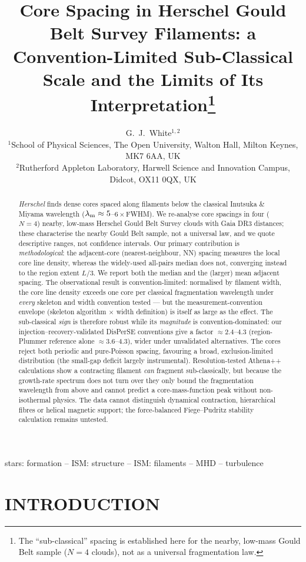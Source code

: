 \documentclass[usenatbib,twoside,twocolumn]{mnras}
\title[Sub-classical core spacing in HGBS filaments]{Core Spacing in Herschel Gould Belt Survey Filaments: a Convention-Limited Sub-Classical Scale and the Limits of Its Interpretation\thanks{The ``sub-classical'' spacing is established here for the nearby, low-mass Gould Belt sample ($N=4$ clouds), not as a universal fragmentation law.}}
\author[G.~J.~White]{G.~J.~White$^{1,2}$\\
$^{1}$School of Physical Sciences, The Open University, Walton Hall, Milton Keynes, MK7 6AA, UK\\
$^{2}$Rutherford Appleton Laboratory, Harwell Science and Innovation Campus, Didcot, OX11 0QX, UK}
\begin{document}
\maketitle

\begin{abstract}
\textit{Herschel} finds dense cores spaced along filaments below the classical Inutsuka \& Miyama wavelength ($\lambda_{\rm m}\approx5$--$6\times$FWHM). We re-analyse core spacings in four ($N=4$) nearby, low-mass Herschel Gould Belt Survey clouds with Gaia DR3 distances; these characterise the nearby Gould Belt sample, not a universal law, and we quote descriptive ranges, not confidence intervals. Our primary contribution is \emph{methodological}: the adjacent-core (nearest-neighbour, NN) spacing measures the local core line density, whereas the widely-used all-pairs median does not, converging instead to the region extent $L/3$. We report both the median and the (larger) mean adjacent spacing. The observational result is convention-limited: normalised by filament width, the core line density exceeds one core per classical fragmentation wavelength under \emph{every} skeleton and width convention tested --- but the measurement-convention envelope (skeleton algorithm $\times$ width definition) is itself as large as the effect. The sub-classical \emph{sign} is therefore robust while its \emph{magnitude} is convention-dominated: our injection--recovery-validated DisPerSE conventions give a factor $\approx2.4$--$4.3$ (region-Plummer reference alone $\approx3.6$--$4.3$), wider under unvalidated alternatives. The cores reject both periodic and pure-Poisson spacing, favouring a broad, exclusion-limited distribution (the small-gap deficit largely instrumental). Resolution-tested Athena++ calculations show a contracting filament \emph{can} fragment sub-classically, but because the growth-rate spectrum does not turn over they only bound the fragmentation wavelength from above and cannot predict a core-mass-function peak without non-isothermal physics. The data cannot distinguish dynamical contraction, hierarchical fibres or helical magnetic support; the force-balanced Fiege--Pudritz stability calculation remains untested.
\end{abstract}


\begin{keywords}
stars: formation -- ISM: structure -- ISM: filaments -- MHD -- turbulence
\end{keywords}

\section{INTRODUCTION}
\end{document}
